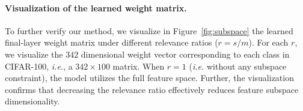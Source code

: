 \paragraph{Visualization of the learned weight matrix.}

To further verify our method, we visualize in Figure~\ref{fig:subspace} the 
learned final-layer weight matrix under different relevance ratios ($r = s/m$). For each $r$, we visualize the $342$ dimensional weight vector corresponding to each class in CIFAR-100, \emph{i.e.}, a $342 \times 100$ matrix. When $r=1$ (\emph{i.e.} without any subspace constraint), the model utilizes the full feature space. Further, the visualization confirms that decreasing the relevance ratio effectively reduces feature subspace dimensionality. 

\begin{table}[h]
\centering
\small
{}
\caption{\small Ablation on subspace selection methods. Best performing results are marked in \textbf{bold}. Model is DenseNet. All values are averaged over multiple OOD test datasets.}
\label{tab:subspace-selection}
\end{table}


